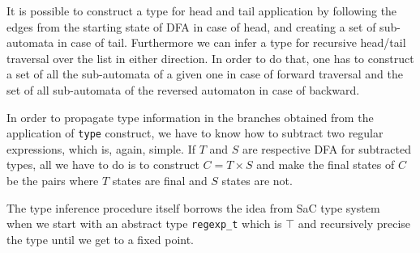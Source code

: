 It is possible to construct a type for head and tail application
by following the edges from the starting state of DFA in case of
head, and creating a set of sub-automata in case of tail.
Furthermore we can infer a type for recursive head/tail traversal
over the list in either direction.  In order to do that, one has
to construct a set of all the sub-automata of a given one in 
case of forward traversal and the set of all sub-automata of
the reversed automaton in case of backward.

In order to propagate type information in the branches obtained from the
application of \verb|type| construct, we have to know how to subtract
two regular expressions, which is, again, simple.  If $T$ and $S$  are
respective DFA for subtracted types, all we have to do is to construct
$C = T \times S$ and make the final states of $C$ be the pairs where $T$
states are final and $S$ states are not. 

The type inference procedure itself borrows the idea from SaC type
system~\cite{} when we start with an abstract type \verb|regexp_t|
which is $\top$ and recursively precise the type until we get to
a fixed point.







